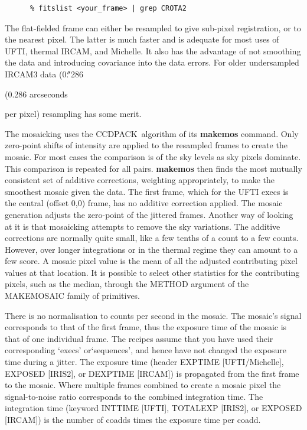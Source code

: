 \documentclass[twoside,11pt]{article}
\newenvironment{latexonly}{}{}
\newcommand{\xref}[3]{#1}
\renewcommand{\_}{\texttt{\symbol{95}}}
\newcommand{\arcm}{\hbox{$^\prime$}}
\newcommand{\arcm}{{\rawhtml &acute;}}
\newcommand{\arcsec}{\arcm\hskip -0.1em\arcm}
\newcommand{\arcsec}{{\rawhtml &quot;}}
\newcommand{\uarcs}{\hskip-0.27em\arcsec\hskip-0.02em}
\newcommand{\uarcs}{{\rawhtml &quot;}}
\newcommand{\CCDPACK}{{\footnotesize CCDPACK}}
\begin{document}
\begin{verbatim}
      % fitslist <your_frame> | grep CROTA2
\end{verbatim}

The flat-fielded frame can either be resampled to give sub-pixel
registration, or to the nearest pixel. The latter is much faster and
is adequate for most uses of UFTI, thermal IRCAM, and Michelle.  It also
has the advantage of not smoothing the data and introducing covariance
into the data errors.  For older
undersampled IRCAM3 data
\begin{latexonly}
(0.$\uarcs$286
\end{latexonly}
\begin{htmlonly}
(0.286 arcseconds
\end{htmlonly}
per pixel) resampling has some merit.

The mosaicking uses the \xref{\CCDPACK\ algorithm}{sun139}{mosaicing}
of its \xref{{\bf makemos}}{sun139}{MAKEMOS} command.  Only zero-point
shifts of intensity are applied to the resampled frames to create the
mosaic.  For most cases the comparison is of the sky levels as sky
pixels dominate.  This comparison is repeated for all pairs.  {\bf
makemos} then finds the most mutually consistent set of additive
corrections, weighting appropriately, to make the smoothest mosaic
given the data. The first frame, which for the UFTI execs is the
central (offset 0,0) frame, has no additive correction applied.  The
mosaic generation adjusts the zero-point of the jittered frames.
Another way of looking at it is that mosaicking attempts to remove the
sky variations.  The additive corrections are normally quite small,
like a few tenths of a count to a few counts.  However, over longer
integrations or in the thermal regime they can amount to a few score.
A mosaic pixel value is the mean of all the adjusted contributing
pixel values at that location.  It is possible to select other
statistics for the contributing pixels, such as the median, through
the METHOD argument of the \_MAKE\_MOSAIC\_ family of primitives.

There is no normalisation to counts per second in the mosaic. The
mosaic's signal corresponds to that of the first frame, thus the
exposure time of the mosaic is that of one individual frame.  The
recipes assume that you have used their corresponding `execs'
or`sequences', and hence have not changed the exposure time during a
jitter.  The exposure time (header EXP\_TIME [UFTI/Michelle], EXPOSED
[IRIS2], or
DEXPTIME [IRCAM]) is propagated from the first frame to the mosaic.
Where multiple frames combined to create a mosaic pixel the
signal-to-noise ratio corresponds to the combined integration time.
The integration time (keyword INT\_TIME [UFTI], TOTALEXP [IRIS2],
or EXPOSED [IRCAM]) is the number of coadds times the exposure time per coadd.
\end{document}
